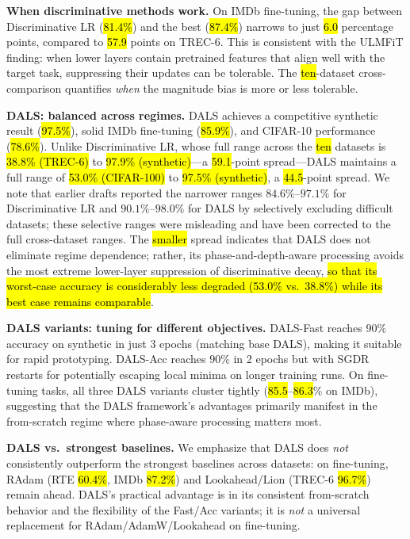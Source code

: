 \documentclass[a4paper,fleqn]{cas-dc}
\begin{document}
\textbf{When discriminative methods work.} On IMDb fine-tuning, the gap between Discriminative LR (\hl{81.4\%}) and the best (\hl{87.4\%}) narrows to just \hl{6.0} percentage points, compared to \hl{57.9} points on TREC-6. This is consistent with the ULMFiT finding: when lower layers contain pretrained features that align well with the target task, suppressing their updates can be tolerable. The \hl{ten}-dataset cross-comparison quantifies \emph{when} the magnitude bias is more or less tolerable.

\textbf{DALS: balanced across regimes.} DALS achieves a competitive synthetic result (\hl{97.5\%}), solid IMDb fine-tuning (\hl{85.9\%}), and CIFAR-10 performance (\hl{78.6\%}). Unlike Discriminative LR, whose full range across the \hl{ten} datasets is \hl{38.8\% (TREC-6)} to \hl{97.9\% (synthetic)}---a \hl{59.1}-point spread---DALS maintains a full range of \hl{53.0\% (CIFAR-100)} to \hl{97.5\% (synthetic)}, a \hl{44.5}-point spread. We note that earlier drafts reported the narrower ranges $84.6\%$--$97.1\%$ for Discriminative LR and $90.1\%$--$98.0\%$ for DALS by selectively excluding difficult datasets; these selective ranges were misleading and have been corrected to the full cross-dataset ranges. The \hl{smaller} spread indicates that DALS does not eliminate regime dependence; rather, its phase-and-depth-aware processing avoids the most extreme lower-layer suppression of discriminative decay, \hl{so that its worst-case accuracy is considerably less degraded (53.0\% vs.\ 38.8\%) while its best case remains comparable}.

\textbf{DALS variants: tuning for different objectives.} DALS-Fast reaches $90\%$ accuracy on synthetic in just 3 epochs (matching base DALS), making it suitable for rapid prototyping. DALS-Acc reaches $90\%$ in 2 epochs but with SGDR restarts for potentially escaping local minima on longer training runs. On fine-tuning tasks, all three DALS variants cluster tightly (\hl{85.5}--\hl{86.3}\% on IMDb), suggesting that the DALS framework's advantages primarily manifest in the from-scratch regime where phase-aware processing matters most.

\textbf{DALS vs.\ strongest baselines.} We emphasize that DALS does \emph{not} consistently outperform the strongest baselines across datasets: on fine-tuning, RAdam (RTE \hl{60.4\%}, IMDb \hl{87.2\%}) and Lookahead/Lion (TREC-6 \hl{96.7\%}) remain ahead. DALS's practical advantage is in its consistent from-scratch behavior and the flexibility of the Fast/Acc variants; it is \emph{not} a universal replacement for RAdam/AdamW/Lookahead on fine-tuning.
\end{document}
